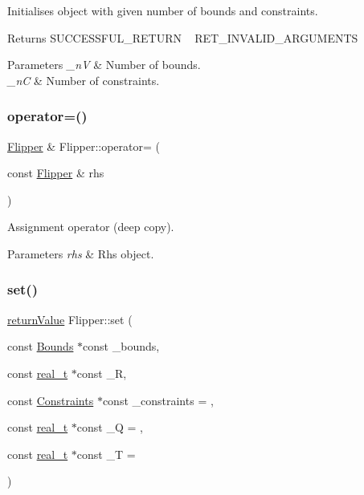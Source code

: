 Initialises object with given number of bounds and constraints. \begin{DoxyReturn}{Returns}
S\+U\+C\+C\+E\+S\+S\+F\+U\+L\+\_\+\+R\+E\+T\+U\+RN ~\newline
 R\+E\+T\+\_\+\+I\+N\+V\+A\+L\+I\+D\+\_\+\+A\+R\+G\+U\+M\+E\+N\+TS 
\end{DoxyReturn}

\begin{DoxyParams}{Parameters}
{\em \+\_\+nV} & Number of bounds. \\
\hline
{\em \+\_\+nC} & Number of constraints. \\
\hline
\end{DoxyParams}
\mbox{\label{class_flipper_ad1f1f6c3ae1e54a43eb70c9c2d7bb023}} 
\subsubsection{\texorpdfstring{operator=()}{operator=()}}
{\footnotesize\ttfamily \hyperlink{class_flipper}{Flipper} \& Flipper\+::operator= (\begin{DoxyParamCaption}\item[{const \hyperlink{class_flipper}{Flipper} \&}]{rhs }\end{DoxyParamCaption})}

Assignment operator (deep copy). 
\begin{DoxyParams}{Parameters}
{\em rhs} & Rhs object. \\
\hline
\end{DoxyParams}
\mbox{\label{class_flipper_a51f18dc856dfbf43447faf263182e8c2}} 
\subsubsection{\texorpdfstring{set()}{set()}}
{\footnotesize\ttfamily \hyperlink{_message_handling_8hpp_a81d556f613bfbabd0b1f9488c0fa865e}{return\+Value} Flipper\+::set (\begin{DoxyParamCaption}\item[{const \hyperlink{class_bounds}{Bounds} $\ast$const}]{\+\_\+bounds,  }\item[{const \hyperlink{qp_o_a_s_e_s__wrapper_8h_a0d00e2b3dfadee81331bbb39068570c4}{real\+\_\+t} $\ast$const}]{\+\_\+R,  }\item[{const \hyperlink{class_constraints}{Constraints} $\ast$const}]{\+\_\+constraints = {},  }\item[{const \hyperlink{qp_o_a_s_e_s__wrapper_8h_a0d00e2b3dfadee81331bbb39068570c4}{real\+\_\+t} $\ast$const}]{\+\_\+Q = {},  }\item[{const \hyperlink{qp_o_a_s_e_s__wrapper_8h_a0d00e2b3dfadee81331bbb39068570c4}{real\+\_\+t} $\ast$const}]{\+\_\+T = {} }\end{DoxyParamCaption})}

